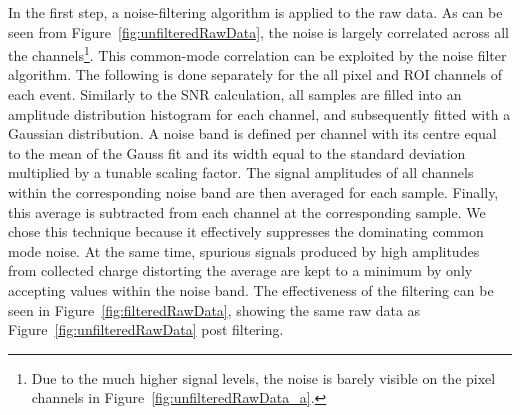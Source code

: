 \documentclass[instruments,article,submit,moreauthors,pdftex]{Definitions/mdpi}
\begin{document}
In the first step, a noise-filtering algorithm is applied to the raw data.
As can be seen from Figure~\ref{fig:unfilteredRawData}, the noise is largely correlated across all the channels\footnote{Due to the much higher signal levels, the noise is barely visible on the pixel channels in Figure~\ref{fig:unfilteredRawData_a}.}.
This common-mode correlation can be exploited by the noise filter algorithm.
The following is done separately for the all pixel and ROI channels of each event.
Similarly to the SNR calculation, all samples are filled into an amplitude distribution histogram for each channel, and subsequently fitted with a Gaussian distribution.
A noise band is defined per channel with its centre equal to the mean of the Gauss fit and its width equal to the standard deviation multiplied by a tunable scaling factor.
The signal amplitudes of all channels within the corresponding noise band are then averaged for each sample.
Finally, this average is subtracted from each channel at the corresponding sample.
We chose this technique because it effectively suppresses the dominating common mode noise.
At the same time, spurious signals produced by high amplitudes from collected charge distorting the average are kept to a minimum by only accepting values within the noise band.
The effectiveness of the filtering can be seen in Figure~\ref{fig:filteredRawData}, showing the same raw data as Figure~\ref{fig:unfilteredRawData} post filtering.
\end{document}
